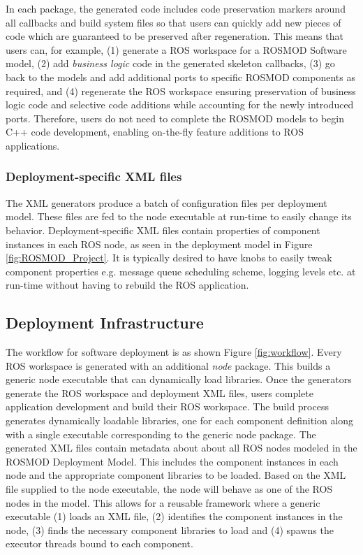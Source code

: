  In each package, the generated code includes code preservation markers around all callbacks and build system files so that users can quickly add new pieces of code which are guaranteed to be preserved after regeneration. This means that users can, for example, (1) generate a ROS workspace for a ROSMOD Software model, (2) add \emph{business logic} code in the generated skeleton callbacks, (3) go back to the models and add additional ports to specific ROSMOD components as required, and (4) regenerate the ROS workspace ensuring preservation of business logic code and selective code additions while accounting for the newly introduced ports. Therefore, users do not need to complete the ROSMOD models to begin C++ code development, enabling on-the-fly feature additions to ROS applications.

\subsubsection{Deployment-specific XML files}

The XML generators produce a batch of configuration files per deployment model. These files are fed to the node executable at run-time to easily change its behavior. Deployment-specific XML files contain properties of component instances in each ROS node, as seen in the deployment model in Figure \ref{fig:ROSMOD_Project}. It is typically desired to have knobs to easily tweak component properties e.g. message queue scheduling scheme, logging levels etc. at run-time without having to rebuild the ROS application. 

\subsection{Deployment Infrastructure}
\label{sec:Deployment_Infrastructure}

The workflow for software deployment is as shown Figure \ref{fig:workflow}. Every ROS workspace is generated with an additional \emph{node} package. This builds a generic node executable that can dynamically load libraries. Once the generators generate the ROS workspace and deployment XML files, users complete application development and build their ROS workspace. The build process generates dynamically loadable libraries, one for each component definition along with a single executable corresponding to the generic node package. The generated XML files contain metadata about about all ROS nodes modeled in the ROSMOD Deployment Model. This includes the component instances in each node and the appropriate component libraries to be loaded. Based on the XML file supplied to the node executable, the node will behave as one of the ROS nodes in the model. This allows for a reusable framework where a generic executable (1) loads an XML file, (2) identifies the component instances in the node, (3) finds the necessary component libraries to load and (4) spawns the executor threads bound to each component. 

